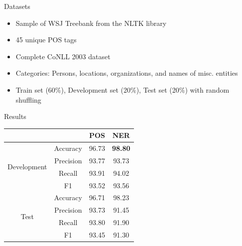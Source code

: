 \documentclass{beamer}
\begin{document}
\begin{frame}{Datasets}
    \begin{itemize}
        \item{
            Sample of WSJ Treebank from the NLTK library
            }
        \item{
            45 unique POS tags
            }
        \item{
            Complete CoNLL 2003 dataset
            }
        \item{
            Categories: Persons, locations, organizations, and names of
            misc. entities
            }
        \item{
            Train set (60\%), Development set (20\%), Test set (20\%) with
            random shuffling
            }
    \end{itemize}
\end{frame}

\begin{frame}{Results}
    \begin{center}
        \begin{tabular}{ |c|c|c|c| }
        \hline
        &  & {\textbf{POS}} & {\textbf{NER}}\\ \hline
        \multirow{4}{*}{Development} & Accuracy & 96.73 & \textbf{98.80} \\
         & Precision & 93.77 & 93.73 \\
         & Recall & 93.91 & 94.02 \\
         & F1 & 93.52 & 93.56 \\ \hline
        \multirow{4}{*}{Test} & Accuracy & 96.71 & 98.23 \\
         & Precision & 93.73 & 91.45 \\
         & Recall & 93.80 & 91.90 \\
         & F1 & 93.45 & 91.30 \\ \hline
        \end{tabular}
        \label{tab:dropout}
    \end{center}
\end{frame}
\end{document}
